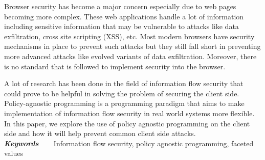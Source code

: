 \providecommand{\keywords}[1]{\textbf{\textit{Keywords~~~}} #1}

Browser security has become a major concern especially due to web pages becoming
more complex. These web applications handle a lot of information including
sensitive information that may be vulnerable to attacks like data exfiltration,
cross site scripting (XSS), etc. Most modern browsers have security mechanisms in
place to prevent such attacks but they still fall short in preventing more advanced
attacks like evolved variants of data exfiltration. Moreover, there is no standard
that is followed to implement security into the browser.
\par A lot of research has been done in the field of information flow security
that could prove to be helpful in solving the problem of securing the client side.
Policy-agnostic programming is a programming paradigm that aims to make implementation
of information flow security in real world systems more flexible. In this paper,
we explore the use of policy agnostic programming on the client side and how it
will help prevent common client side attacks.\\
\keywords{Information flow security, policy agnostic programming, faceted values}
